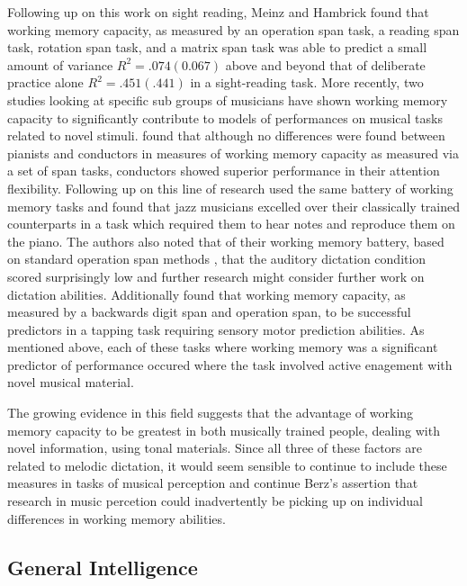 \documentclass[]{book}
\theoremstyle{definition}
\theoremstyle{definition}
\theoremstyle{definition}
\theoremstyle{remark}
\begin{document}
Following up on this work on sight reading, Meinz and Hambrick
\citep{meinzDeliberatePracticeNecessary2010} found that working memory
capacity, as measured by an operation span task, a reading span task,
rotation span task, and a matrix span task was able to predict a small
amount of variance \(R^2=.074(0.067)\) above and beyond that of
deliberate practice alone \(R^2=.451(.441)\) in a sight-reading task.
More recently, two studies looking at specific sub groups of musicians
have shown working memory capacity to significantly contribute to models
of performances on musical tasks related to novel stimuli.
\citep{wollnerAttentionalFlexibilityMemory2016} found that although no
differences were found between pianists and conductors in measures of
working memory capacity as measured via a set of span tasks, conductors
showed superior performance in their attention flexibility. Following up
on this line of research \citep{nicholsScoreOneJazz2018} used the same
battery of working memory tasks and found that jazz musicians excelled
over their classically trained counterparts in a task which required
them to hear notes and reproduce them on the piano. The authors also
noted that of their working memory battery, based on standard operation
span methods \citep{engleWorkingMemoryCapacity2002}, that the auditory
dictation condition scored surprisingly low and further research might
consider further work on dictation abilities. Additionally
\citep{colleyWorkingMemoryAuditory2018} found that working memory
capacity, as measured by a backwards digit span and operation span, to
be successful predictors in a tapping task requiring sensory motor
prediction abilities. As mentioned above, each of these tasks where
working memory was a significant predictor of performance occured where
the task involved active enagement with novel musical material.

The growing evidence in this field suggests that the advantage of
working memory capacity to be greatest in both musically trained people,
dealing with novel information, using tonal materials. Since all three
of these factors are related to melodic dictation, it would seem
sensible to continue to include these measures in tasks of musical
perception and continue Berz's assertion that research in music
percetion could inadvertently be picking up on individual differences in
working memory abilities.

\hypertarget{general-intelligence}{%
\subsection{General Intelligence}\label{general-intelligence}}
\end{document}
